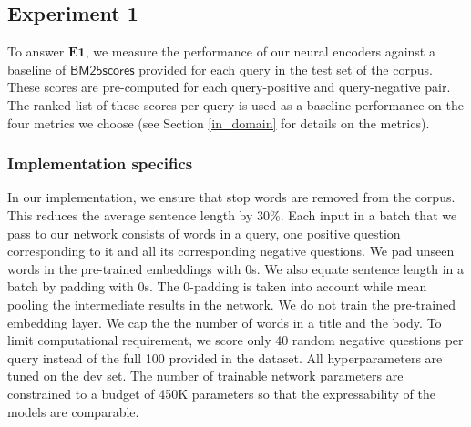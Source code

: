 \documentclass{sigkddExp}
\begin{document}
\subsection{Experiment 1}
To answer $\mathbf{E1}$, we measure the performance of our neural encoders against a baseline of $\mathsf{BM25 scores}$ provided for each query in the test set of the corpus. These scores are pre-computed for each query-positive and query-negative pair. The ranked list of these scores per query is used as a baseline performance on the four metrics we choose (see Section \ref{in_domain} for details on the metrics).

\subsubsection{Implementation specifics} In our implementation, we ensure that stop words are removed from the corpus. This reduces the average sentence length by 30\%. Each input in a batch that we pass to our network consists of words in a query, one positive question corresponding to it and all its corresponding negative questions. We pad unseen words in the pre-trained embeddings with 0s. We also equate sentence length in a batch by padding with 0s. The 0-padding is taken into account while mean pooling the intermediate results in the network. We do not train the pre-trained embedding layer. We cap the the number of words in a title and the body. To limit computational requirement, we score only 40 random negative questions per query instead of the full 100 provided in the dataset. All hyperparameters are tuned on the dev set. The number of trainable network parameters are constrained to a budget of 450K parameters so that the expressability of the models are comparable.
\end{document}
